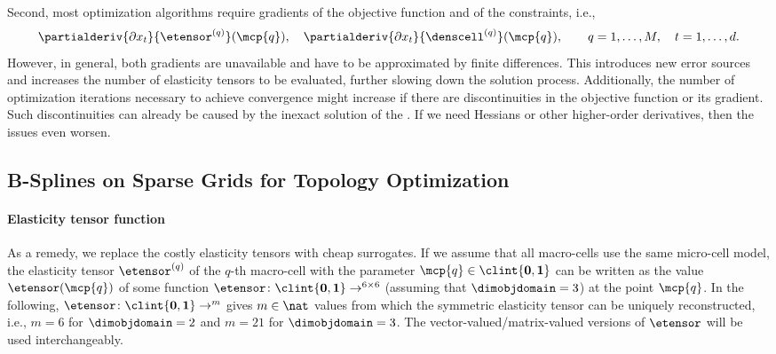 Second, most optimization algorithms require gradients of the
objective function and of the constraints, i.e.,%
\begin{equation}
  \partialderiv{\partialdiff{} x_t}{\etensor^{(q)}}(\mcp{q}),\quad
  \partialderiv{\partialdiff{} x_t}{\denscell^{(q)}}(\mcp{q}),\qquad
  q = 1, \dotsc, M,\quad
  t = 1, \dotsc, d.
\end{equation}
However, in general, both gradients are unavailable and
have to be approximated by finite differences.
This introduces new error sources and
increases the number of elasticity tensors to be evaluated,
further slowing down the solution process.
Additionally, the number of optimization iterations necessary to
achieve convergence might increase
if there are discontinuities in the objective function
or its gradient.
Such discontinuities can already be caused by the inexact solution of the \fem.
If we need Hessians or other higher-order derivatives,
then the issues even worsen.



\subsection{B-Splines on Sparse Grids for Topology Optimization}
\label{sec:622BSplines}

\paragraph{Elasticity tensor function}

As a remedy, we replace the costly elasticity tensors with cheap surrogates.
If we assume that all macro-cells use the same micro-cell model,
the elasticity tensor $\etensor^{(q)}$ of the $q$-th macro-cell
with the parameter $\mcp{q} \in \clint{\*0, \*1}$
can be written as the value $\etensor(\mcp{q})$ of some function
$\etensor\colon \clint{\*0, \*1} \to \real^{6 \times 6}$
(assuming that $\dimobjdomain = 3$) at the point $\mcp{q}$.
In the following,
$\etensor\colon \clint{\*0, \*1} \to \real^m$
gives $m \in \nat$ values from which the symmetric elasticity tensor
can be uniquely reconstructed,
i.e., $m = 6$ for $\dimobjdomain = 2$ and $m = 21$ for $\dimobjdomain = 3$.
The vector-valued/matrix-valued versions of $\etensor$
will be used interchangeably.


